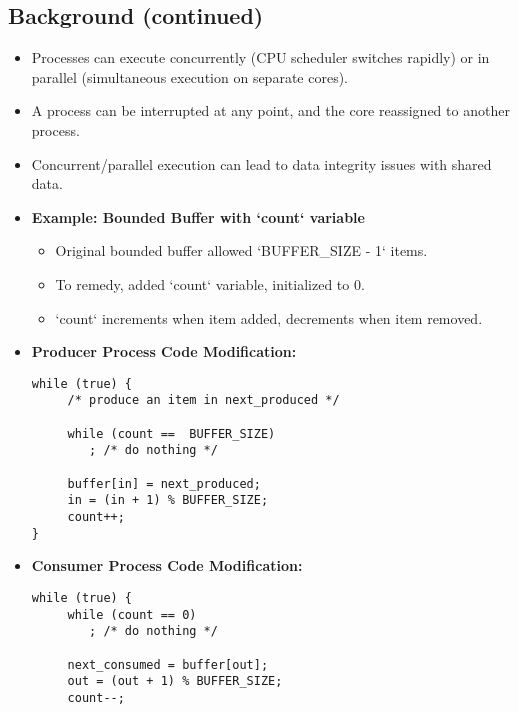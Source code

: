 \subsection{Background (continued)}
\begin{itemize}
    \item Processes can execute concurrently (CPU scheduler switches rapidly) or in parallel (simultaneous execution on separate cores).
    \item A process can be interrupted at any point, and the core reassigned to another process.
    \item Concurrent/parallel execution can lead to data integrity issues with shared data.
    \item \textbf{Example: Bounded Buffer with `count` variable}
    \begin{itemize}
        \item Original bounded buffer allowed `BUFFER\_SIZE - 1` items.
        \item To remedy, added `count` variable, initialized to 0.
        \item `count` increments when item added, decrements when item removed.
    \end{itemize}
    \item \textbf{Producer Process Code Modification:}
\begin{verbatim}
while (true) {
     /* produce an item in next_produced */
 
     while (count ==  BUFFER_SIZE)
        ; /* do nothing */

     buffer[in] = next_produced;
     in = (in + 1) % BUFFER_SIZE;
     count++;
}
\end{verbatim}
    \item \textbf{Consumer Process Code Modification:}
\begin{verbatim}
while (true) {
     while (count == 0)
        ; /* do nothing */
 
     next_consumed = buffer[out];
     out = (out + 1) % BUFFER_SIZE;
     count--;
 

\end{verbatim}
\end{itemize}
